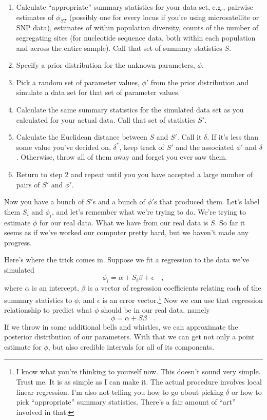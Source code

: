 \begin{enumerate}

\item Calculate ``appropriate'' summary statistics for your data set,
  e.g., pairwise estimates of $\phi_{ST}$ (possibly one for every
  locus if you're using microsatellite or SNP data), estimates of
  within population diversity, counts of the number of segregating
  sites (for nucleotide sequence data, both within each population and
  across the entire sample). Call that set of summary statistics $S$.

\item Specify a prior distribution for the unknown parameters, $\phi$.

\item Pick a random set of parameter values, $\phi'$ from the prior
  distribution and simulate a data set for that set of parameter
  values.

\item Calculate the same summary statistics for the simulated
  data set as you calculated for your actual data. Call that set of
  statistics $S'$. 

\item Calculate the Euclidean distance between $S$ and $S'$. Call it
  $\delta$. If it's less than some value you've decided on,
  $\delta^*$, keep track of $S'$ and the associated $\phi'$ and
  $\delta$. Otherwise, throw all of them away and forget you ever saw
  them.

\item Return to step 2 and repeat until you you have accepted a large
  number of pairs of $S'$ and $\phi'$.

\end{enumerate}

Now you have a bunch of $S'$s and a bunch of $\phi'$s that produced
them. Let's label them $S_i$ and $\phi_i$, and let's remember what
we're trying to do. We're trying to estimate $\phi$ for our real
data. What we have from our real data is $S$. So far it seems as if
we've worked our computer pretty hard, but we haven't made any
progress. 

Here's where the trick comes in. Suppose we fit a regression to the
data we've simulated
\[
\phi_i = \alpha + S_i\beta + \epsilon \quad ,
\]
where $\alpha$ is an intercept, $\beta$ is a vector of regression
coefficients relating each of the summary statistics to $\phi$, and
$\epsilon$ is an error vector.\footnote{I know what you're thinking to
  yourself now. This doesn't sound very simple. Trust me. It is as
  simple as I can make it. The actual procedure involves local linear
  regression. I'm also not telling you how to go about picking
  $\delta$ or how to pick ``appropriate'' summary statistics. There's
  a fair amount of ``art'' involved in that.} Now we can use that
regression relationship to predict what $\phi$ should be in our real
data, namely
\[
\phi = \alpha + S\beta \quad .
\]
If we throw in some additional bells and whistles, we can approximate
the posterior distribution of our parameters. With that we can get not
only a point estimate for $\phi$, but also credible intervals for all
of its components.

